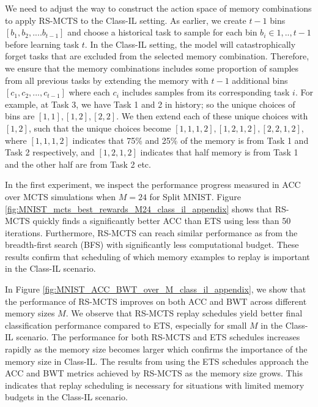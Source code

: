 We need to adjust the way to construct the action space of memory combinations to apply RS-MCTS to the Class-IL setting. As earlier, we create $t-1$ bins $[b_1, b_2, ....b_{t-1}]$ and choose a historical task to sample for each bin $b_i \in {1,.., t-1}$ before learning task $t$. In the Class-IL setting, the model will catastrophically forget tasks that are excluded from the selected memory combination. Therefore, we ensure that the memory combinations includes some proportion of samples from all previous tasks by extending the memory with $t-1$ additional bins $[c_1, c_2, ..., c_{t-1}]$ where each $c_i$ includes samples from its corresponding task $i$. For example, at Task 3, we have Task 1 and 2 in history; so the unique choices of bins are $[1,1], [1,2], [2,2]$. We then extend each of these unique choices with $[1, 2]$, such that the unique choices become $[1,1,1,2], [1,2,1,2], [2,2,1,2]$, where $[1,1,1,2]$ indicates that 75\% and 25\% of the memory is from Task 1 and Task 2 respectively, and $[1,2,1,2]$ indicates that half memory is from Task 1 and the other half are from Task 2 etc.

In the first experiment, we inspect the performance progress measured in ACC over MCTS simulations when $M=24$ for Split MNIST. Figure \ref{fig:MNIST_mcts_best_rewards_M24_class_il_appendix} shows that RS-MCTS quickly finds a significantly better ACC than ETS using less than 50 iterations. Furthermore, RS-MCTS can reach similar performance as from the breadth-first search (BFS) with significantly less computational budget. These results confirm that scheduling of which memory examples to replay is important in the Class-IL scenario. 

In Figure \ref{fig:MNIST_ACC_BWT_over_M_class_il_appendix}, we show that the performance of RS-MCTS improves on both ACC and BWT across  different  memory sizes $M$. We observe that RS-MCTS replay schedules yield better final classification performance compared to ETS, especially for small $M$ in the Class-IL scenario. The performance for both RS-MCTS and ETS schedules increases rapidly as the memory size becomes larger which confirms the importance of the memory size in Class-IL. The results from using the ETS schedules approach the ACC and BWT metrics achieved by RS-MCTS as the memory size grows. This indicates that replay scheduling is necessary for situations with limited memory budgets in the Class-IL scenario. 

